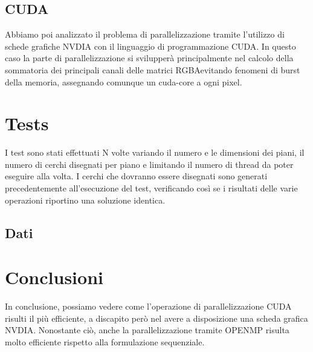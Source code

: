\documentclass[11pt]{article}
\begin{document}
    \subsection{CUDA}\label{subsec:cuda}
    Abbiamo poi analizzato il problema di parallelizzazione tramite l'utilizzo di schede grafiche NVDIA
    con il linguaggio di programmazione CUDA\@.
    In questo caso la parte di parallelizzazione si svilupperà principalmente nel calcolo della sommatoria
    dei principali canali delle matrici RGBA\@ evitando fenomeni di burst della memoria, assegnando comunque
    un cuda-core a ogni pixel.
    \clearpage

    \section{Tests}\label{sec:tests}
    I test sono stati effettuati N volte variando il numero e le dimensioni dei piani, il numero di cerchi disegnati
    per piano e limitando il numero di thread da poter eseguire alla volta.
    I cerchi che dovranno essere disegnati sono generati precedentemente all'esecuzione del test, verificando
    così se i risultati delle varie operazioni riportino una soluzione identica.
    \subsection{Dati}\label{subsec:dati}

    \clearpage

    \section{Conclusioni}\label{sec:conclusioni}
    In conclusione, possiamo vedere come l'operazione di parallelizzazione CUDA risulti il più efficiente, a
    discapito però nel avere a disposizione una scheda grafica NVDIA\@.
    Nonostante ciò, anche la parallelizzazione tramite OPENMP risulta molto efficiente rispetto alla formulazione
    sequenziale.
\end{document}
